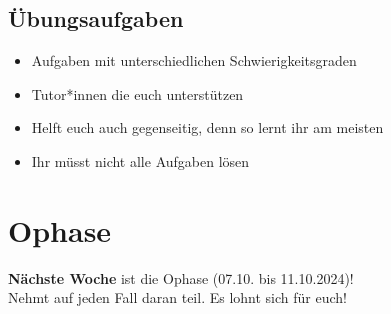 \subsection{Übungsaufgaben}
\begin{frame}
    \slidehead
    \begin{itemize}
        \item Aufgaben mit unterschiedlichen Schwierigkeitsgraden
        \item Tutor*innen
            die euch unterstützen
        \item Helft euch auch gegenseitig, denn so lernt ihr am meisten
        \item Ihr müsst nicht alle Aufgaben lösen
    \end{itemize}
\end{frame}

\section{Ophase}
\begin{frame}
    \slidehead
    \textbf{Nächste Woche} ist die Ophase (07.10. bis 11.10.2024)! \\
    Nehmt auf jeden Fall daran teil. Es lohnt sich für euch!
\end{frame}


